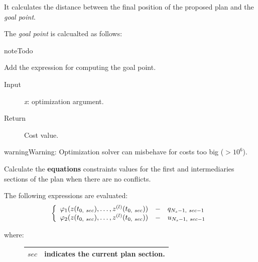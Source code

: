 \documentclass[letterpaper,10pt,english]{sphinxmanual}
\begin{document}
\begin{fulllineitems}
\begin{fulllineitems}
It calculates the distance between the final position of the proposed plan and
the \emph{goal point}.

The \emph{goal point} is calcualted as follows:

\begin{notice}{note}{Todo}

Add the expression for computing the goal point.
\end{notice}
\begin{description}
\item[{Input}] \leavevmode
\emph{x}: optimization argument.

\item[{Return}] \leavevmode
Cost value.

\end{description}

\begin{notice}{warning}{Warning:}
Optimization solver can misbehave for costs too big (\(> 10^{6}\)).
\end{notice}

\end{fulllineitems}


\begin{fulllineitems}
\label{Multi-robot motion planner:planning_sim.Robot._sa_feqcons}
Calculate the \textbf{equations} constraints values for the first and intermediaries
sections of the plan when there are no conflicts.

The following expressions are evaluated:
\begin{gather}
\begin{split}\left\lbrace\begin{array}{lcl}
\varphi_1(z(t_{0,\ sec}),\dotsc,z^{(l)}(t_{0,\ sec}))
&-& q_{N_s-1,\ sec-1}\\
\varphi_2(z(t_{0,\ sec}),\dotsc,z^{(l)}(t_{0,\ sec}))
&-& u_{N_s-1,\ sec-1}\\
\end{array}\right.\end{split}\notag
\end{gather}\begin{description}
\item[{where:}] \leavevmode
\begin{tabulary}{\linewidth}{|L|L|}
\hline

\(sec\)
 & 
indicates the current plan section.
\\
\hline\end{tabulary}



\end{description}
\end{fulllineitems}
\end{fulllineitems}
\end{document}

